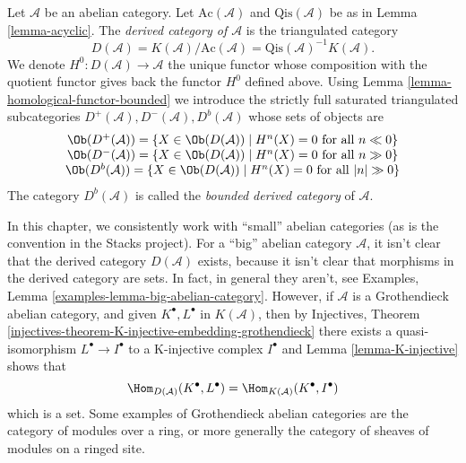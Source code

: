\begin{definition}
\label{definition-unbounded-derived-category}
Let $\mathcal{A}$ be an abelian category.
Let $\text{Ac}(\mathcal{A})$ and $\text{Qis}(\mathcal{A})$
be as in
Lemma \ref{lemma-acyclic}.
The {\it derived category of $\mathcal{A}$} is the triangulated
category
$$
D(\mathcal{A}) =
K(\mathcal{A})/\text{Ac}(\mathcal{A}) =
\text{Qis}(\mathcal{A})^{-1} K(\mathcal{A}).
$$
We denote $H^0 : D(\mathcal{A}) \to \mathcal{A}$ the unique functor
whose composition with the quotient functor gives back the functor
$H^0$ defined above. Using
Lemma \ref{lemma-homological-functor-bounded}
we introduce the strictly full saturated triangulated subcategories
$D^{+}(\mathcal{A}), D^{-}(\mathcal{A}), D^b(\mathcal{A})$
whose sets of objects are
$$
\begin{matrix}
\Ob(D^{+}(\mathcal{A})) =
\{X \in \Ob(D(\mathcal{A})) \mid
H^n(X) = 0\text{ for all }n \ll 0\} \\
\Ob(D^{-}(\mathcal{A})) =
\{X \in \Ob(D(\mathcal{A})) \mid
H^n(X) = 0\text{ for all }n \gg 0\} \\
\Ob(D^b(\mathcal{A})) =
\{X \in \Ob(D(\mathcal{A})) \mid
H^n(X) = 0\text{ for all }|n| \gg 0\}
\end{matrix}
$$
The category $D^b(\mathcal{A})$ is called the {\it bounded derived
category} of $\mathcal{A}$.
\end{definition}

\begin{remark}
\label{remark-existence-derived}
In this chapter, we consistently work with ``small'' abelian categories
(as is the convention in the Stacks project). For a ``big'' abelian
category $\mathcal{A}$, it isn't clear that the derived category
$D(\mathcal{A})$ exists, because it isn't clear that morphisms in the
derived category are sets. In fact, in general they aren't, see
Examples, Lemma \ref{examples-lemma-big-abelian-category}.
However, if $\mathcal{A}$ is a Grothendieck abelian category, and given
$K^\bullet, L^\bullet$ in $K(\mathcal{A})$, then by
Injectives, Theorem \ref{injectives-theorem-K-injective-embedding-grothendieck}
there exists a quasi-isomorphism $L^\bullet \to I^\bullet$ to a
K-injective complex $I^\bullet$ and Lemma \ref{lemma-K-injective} shows that
$$
\Hom_{D(\mathcal{A})}(K^\bullet, L^\bullet) =
\Hom_{K(\mathcal{A})}(K^\bullet, I^\bullet)
$$
which is a set. Some examples of Grothendieck abelian categories
are the category of modules over a ring, or more generally
the category of sheaves of modules on a ringed site.
\end{remark}

